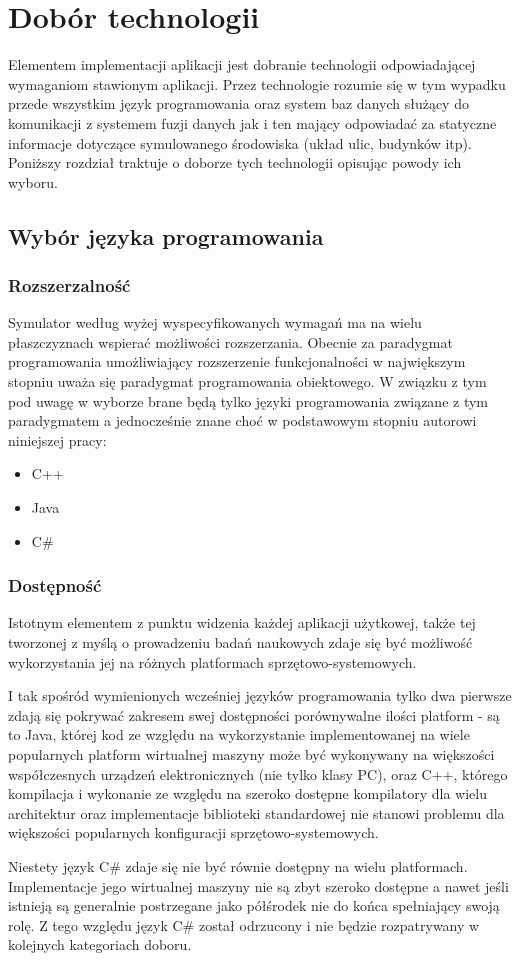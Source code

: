 {\section[Dobór technologii][Dobór technologii]{Dobór technologii}
\par{
Elementem implementacji aplikacji jest dobranie technologii odpowiadającej wymaganiom stawionym aplikacji. Przez technologie rozumie się w tym wypadku przede wszystkim język programowania oraz system baz danych służący do komunikacji z systemem fuzji danych jak i ten mający odpowiadać za statyczne informacje dotyczące symulowanego środowiska (układ ulic, budynków itp).
Poniższy rozdział traktuje o doborze tych technologii opisując powody ich wyboru.
}
\subsection{Wybór języka programowania}
\subsubsection{Rozszerzalność}
\par{
Symulator według wyżej wyspecyfikowanych wymagań ma na wielu płaszczyznach wspierać możliwości rozszerzania. Obecnie za paradygmat programowania umożliwiający rozszerzenie funkcjonalności w największym stopniu uważa się paradygmat programowania obiektowego.
W związku z tym pod uwagę w wyborze brane będą tylko języki programowania związane z tym paradygmatem a jednocześnie znane choć w podstawowym stopniu autorowi niniejszej pracy:
\begin{itemize}
\item C++
\item Java
\item C\#
\end{itemize}
}
\subsubsection{Dostępność}
\par{
Istotnym elementem z punktu widzenia każdej aplikacji użytkowej, także tej tworzonej z myślą o prowadzeniu badań naukowych zdaje się być możliwość wykorzystania jej na różnych platformach sprzętowo-systemowych.
}
\par{
I tak spośród wymienionych wcześniej języków programowania tylko dwa pierwsze zdają się pokrywać zakresem swej dostępności porównywalne ilości platform - są to Java, której kod ze względu na wykorzystanie implementowanej na wiele popularnych platform wirtualnej maszyny może być wykonywany na większości współczesnych urządzeń elektronicznych (nie tylko klasy PC), oraz C++, którego kompilacja i wykonanie ze względu na szeroko dostępne kompilatory dla wielu architektur oraz implementacje biblioteki standardowej nie stanowi problemu dla większości popularnych konfiguracji sprzętowo-systemowych.
}
\par{
Niestety język C\# zdaje się nie być równie dostępny na wielu platformach. Implementacje jego wirtualnej maszyny nie są zbyt szeroko dostępne a nawet jeśli istnieją są generalnie postrzegane jako półśrodek nie do końca spełniający swoją rolę. Z tego względu język C\# został odrzucony i nie będzie rozpatrywany w kolejnych kategoriach doboru.
}
}
